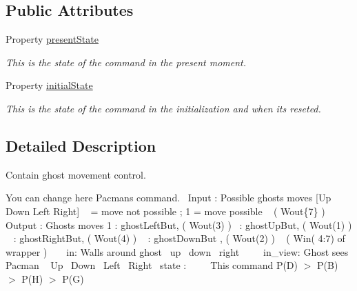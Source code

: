 \subsection*{Public Attributes}
\begin{DoxyCompactItemize}
\item 
Property \hyperlink{class_model_ghost_a9624cc7c421a50fa5086b0ebd0cd5fe3}{present\+State}
\begin{DoxyCompactList}\small\item\em This is the state of the command in the present moment. \end{DoxyCompactList}\item 
Property \hyperlink{class_model_ghost_acd9263acfa96c9138afdf497e55acc24}{initial\+State}
\begin{DoxyCompactList}\small\item\em This is the state of the command in the initialization and when it\textquotesingle{}s reseted. \end{DoxyCompactList}\end{DoxyCompactItemize}


\subsection{Detailed Description}
Contain ghost movement control. 

You can change here Pacman\textquotesingle{}s command.~\newline
 Input \+: Possible ghost\textquotesingle{}s moves \mbox{[}Up Down Left Right\mbox{]} ~ = move not possible ; 1 = move possible ~\newline
 ( Wout\{7\} ) ~\newline
~\newline
 Output \+: Ghost\textquotesingle{}s moves 1 \+: ghost\+Left\+But, ( Wout(3) )~ \+: ghost\+Up\+But, ( Wout(1) ) ~ \+: ghost\+Right\+But, ( Wout(4) ) ~ \+: ghost\+Down\+But , ( Wout(2) ) ~\newline
 ( Win( 4\+:7) of wrapper ) ~\newline
~\newline
 in\+: Walls around ghost~ up~ down~ right~\newline
~\newline
~\newline
 in\+\_\+view\+: Ghost sees Pacman ~ Up~ Down~ Left~ Right~\newline
 state \+:~\newline
~\newline
~\newline
 This command P(\+D) $>$ P(\+B) $>$ P(\+H) $>$ P(\+G)~\newline
 

